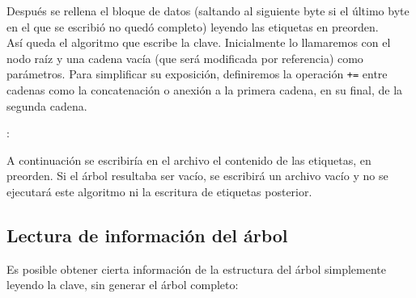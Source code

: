 \documentclass{article}
\newenvironment{algo}{
\vspace*{0.5cm}
\begin{algorithm}[H]}{
\end{algorithm}
\vspace*{0.5cm}
}
\begin{document}
Después se rellena el bloque de datos (saltando al siguiente byte si el último
byte en el que se escribió no quedó completo) leyendo las etiquetas en preorden. \\

Así queda el algoritmo que escribe la clave. Inicialmente lo llamaremos con el
nodo raíz y una cadena vacía (que será modificada por referencia) como parámetros.
Para simplificar su exposición, definiremos la operación \texttt{+=} entre cadenas
como la concatenación o anexión a la primera cadena, en su final, de la segunda
cadena.

\begin{algo}
: \\

\BlankLine


\BlankLine


\end{algo}

A continuación se escribiría en el archivo el contenido de las etiquetas, en
preorden. Si el árbol resultaba ser vacío, se escribirá un archivo vacío y no se
ejecutará este algoritmo ni la escritura de etiquetas posterior.

\subsection{Lectura de información del árbol}

Es posible obtener cierta información de la estructura del árbol simplemente
leyendo la clave, sin generar el árbol completo:
\end{document}
